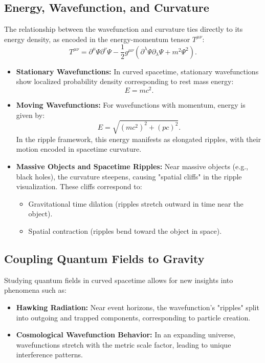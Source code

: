 \documentclass{article}
\begin{document}
\subsection{Energy, Wavefunction, and Curvature}
The relationship between the wavefunction and curvature ties directly to its energy density, as encoded in the energy-momentum tensor \(T^{\mu\nu}\):
\[
T^{\mu\nu} = \partial^\mu \Psi \partial^\nu \Psi - \frac{1}{2} g^{\mu\nu} \left( \partial^\lambda \Psi \partial_\lambda \Psi + m^2 \Psi^2 \right).
\]

\begin{itemize}
    \item \textbf{Stationary Wavefunctions:}
    In curved spacetime, stationary wavefunctions show localized probability density corresponding to rest mass energy:
    \[
    E = mc^2.
    \]

    \item \textbf{Moving Wavefunctions:}
    For wavefunctions with momentum, energy is given by:
    \[
    E = \sqrt{(mc^2)^2 + (pc)^2}.
    \]
    In the ripple framework, this energy manifests as elongated ripples, with their motion encoded in spacetime curvature.

    \item \textbf{Massive Objects and Spacetime Ripples:}
    Near massive objects (e.g., black holes), the curvature steepens, causing "spatial cliffs" in the ripple visualization. These cliffs correspond to:
    \begin{itemize}
        \item Gravitational time dilation (ripples stretch outward in time near the object).
        \item Spatial contraction (ripples bend toward the object in space).
    \end{itemize}
\end{itemize}

\subsection{Coupling Quantum Fields to Gravity}
Studying quantum fields in curved spacetime allows for new insights into phenomena such as:
\begin{itemize}
    \item \textbf{Hawking Radiation:}
    Near event horizons, the wavefunction’s "ripples" split into outgoing and trapped components, corresponding to particle creation.
    \item \textbf{Cosmological Wavefunction Behavior:}
    In an expanding universe, wavefunctions stretch with the metric scale factor, leading to unique interference patterns.
\end{itemize}
\end{document}
